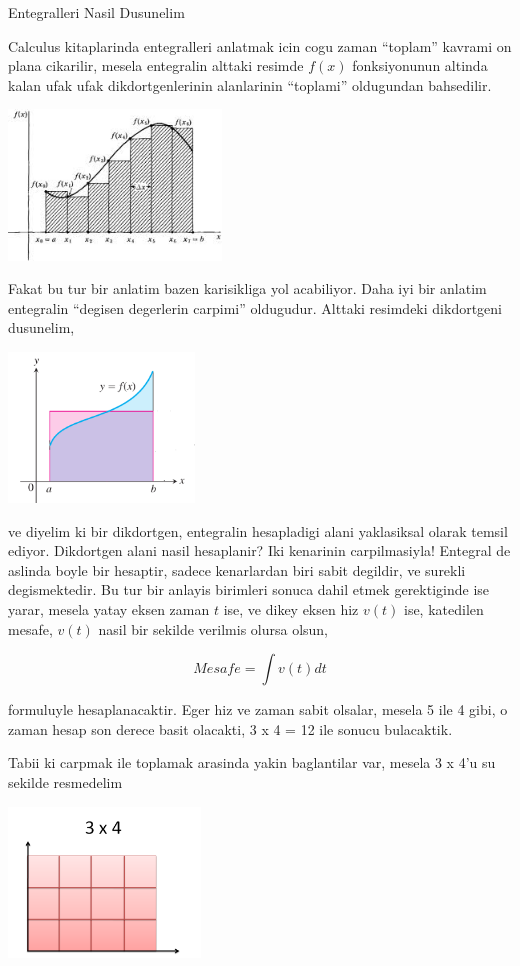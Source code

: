 \documentclass[12pt,fleqn]{article}\usepackage{../common}
\begin{document}
Entegralleri Nasil Dusunelim

Calculus kitaplarinda entegralleri anlatmak icin cogu zaman ``toplam''
kavrami on plana cikarilir, mesela entegralin alttaki resimde $f(x)$
fonksiyonunun altinda kalan ufak ufak dikdortgenlerinin alanlarinin
``toplami'' oldugundan bahsedilir.

\includegraphics[height=4cm]{area.png}

Fakat bu tur bir anlatim bazen karisikliga yol acabiliyor. Daha iyi bir
anlatim entegralin ``degisen degerlerin carpimi'' oldugudur. Alttaki
resimdeki dikdortgeni dusunelim, 

\includegraphics[height=4cm]{box.png}

ve diyelim ki bir dikdortgen, entegralin hesapladigi alani yaklasiksal
olarak temsil ediyor. Dikdortgen alani nasil hesaplanir? Iki kenarinin
carpilmasiyla! Entegral de aslinda boyle bir hesaptir, sadece kenarlardan
biri sabit degildir, ve surekli degismektedir. Bu tur bir anlayis birimleri
sonuca dahil etmek gerektiginde ise yarar, mesela yatay eksen zaman $t$
ise, ve dikey eksen hiz $v(t)$ ise, katedilen mesafe, $v(t)$ nasil bir
sekilde verilmis olursa olsun,

\[ Mesafe = \int v(t)dt \]

formuluyle hesaplanacaktir. Eger hiz ve zaman sabit olsalar, mesela 5 ile 4
gibi, o zaman hesap son derece basit olacakti, 3 x 4 = 12 ile sonucu
bulacaktik. 

Tabii ki carpmak ile toplamak arasinda yakin baglantilar var, mesela 3 x
4'u su sekilde resmedelim

\includegraphics[height=4cm]{grid-multiplication.png}
\end{document}
